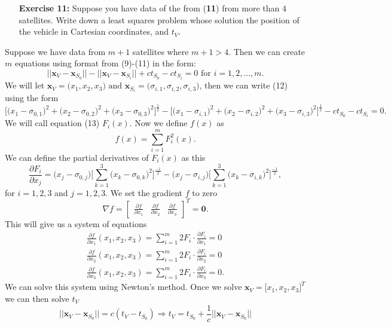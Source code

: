 \documentclass[11pt]{article}
\theoremstyle{definition}
\newcommand{\1}[1]{\mathbf{1} \left \{ #1 \right \}}
\begin{document}
\begin{itemize}
\item[{\textbf{Exercise 11:}}] Suppose you have data of the from (\textbf{11}) from more than $4$ satellites.  Write down a least squares problem whose solution the position of the vehicle in Cartesian coordinates, and $t_V$.
\end{itemize}
Suppose we have data from $m+1$ satellites where $m+1>4$.  Then we can create $m$ equations using format from (9)-(11) in the form:
\begin{equation}
    ||\textbf{x}_V - \textbf{x}_{S_0}|| - ||\textbf{x}_V - \textbf{x}_{S_i}|| + ct_{S_0} - ct_{S_i} = 0 \text{ for } i = 1,2,...,m.
\end{equation}
We will let \(\textbf{x}_V = \big(x_1, x_2, x_3\big) \text{ and } \textbf{x}_{S_i} = \big(\sigma_{i,1}, \sigma_{i,2}, \sigma_{i,3}\big)\), then we can write (12) using the form
\begin{equation}
    \Big[\big(x_1 - \sigma_{0,1}\big)^2 + \big(x_2 - \sigma_{0,2}\big)^2 + \big(x_3 - \sigma_{0,3}\big)^2\Big]^{\frac{1}{2}} - \Big[\big(x_1 - \sigma_{i,1}\big)^2 + \big(x_2 - \sigma_{i,2}\big)^2 + \big(x_3 - \sigma_{i,3}\big)^2\Big]^{\frac{1}{2}} - ct_{S_0} - ct_{S_i} = 0.
\end{equation}
We will call equation (13) $F_i (x)$.  Now we define $f(x)$ as
\begin{equation}
    f(x) = \sum_{i=1}^m F_i^2 (x).
\end{equation}
We can define the partial derivatives of $F_i(x)$ as this
\begin{equation}
    \frac{\partial F_i}{\partial x_j} = \big(x_j - \sigma_{0,j}\big) \Bigg[\sum_{k=1}^3 \big(x_k - \sigma_{0,k}\big)^2\Bigg]^\frac{-1}{2} - \big(x_j - \sigma_{i,j}\big) \Bigg[\sum_{k=1}^3 \big(x_k - \sigma_{i,k}\big)^2\Bigg]^\frac{-1}{2},
\end{equation}
for $i = 1,2,3$ and $j = 1,2,3$.  We set the gradient $f$ to zero \[\nabla f = \begin{bmatrix}
\frac{\partial f}{\partial x_1} & \frac{\partial f}{\partial x_2} & \frac{\partial f}{\partial x_3}
\end{bmatrix}^T = \textbf{0}.\]
This will give us a system of equations
\begin{align*}
    \frac{\partial f}{\partial x_1}(x_1,x_2,x_3) = \sum_{i=1}^m 2F_i \cdot \frac{\partial F_i}{\partial x_1} =0 \\
    \frac{\partial f}{\partial x_2}(x_1,x_2,x_3) = \sum_{i=1}^m 2F_i \cdot \frac{\partial F_i}{\partial x_2} =0 \\
    \frac{\partial f}{\partial x_3}(x_1,x_2,x_3) = \sum_{i=1}^m 2F_i \cdot \frac{\partial F_i}{\partial x_3} =0.
\end{align*}
We can solve this system using Newton's method.  Once we solve \(\textbf{x}_V = \big[x_1, x_2, x_3\big]^T\) we can then solve $t_V$
\[\big|\big|\textbf{x}_V - \textbf{x}_{S_0}\big|\big| = c(t_V - t_{S_0}) \Rightarrow t_V = t_{S_0} + \frac{1}{c}\bigg|\bigg|\textbf{x}_V - \textbf{x}_{S_0}\bigg|\bigg|\]
\end{document}
